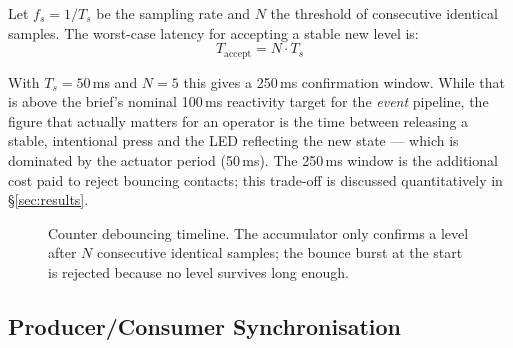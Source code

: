 \documentclass[12pt]{article}
\begin{document}
Let $f_s = 1/T_s$ be the sampling rate and $N$ the threshold of consecutive identical samples. The worst-case latency for accepting a stable new level is:
\begin{equation}
T_{\text{accept}} = N \cdot T_s
\label{eq:debounce_latency}
\end{equation}

With $T_s = 50$\,ms and $N = 5$ this gives a 250\,ms confirmation window. While that is above the brief's nominal 100\,ms reactivity target for the \emph{event} pipeline, the figure that actually matters for an operator is the time between releasing a stable, intentional press and the LED reflecting the new state --- which is dominated by the actuator period (50\,ms). The 250\,ms window is the additional cost paid to reject bouncing contacts; this trade-off is discussed quantitatively in §\ref{sec:results}.

\begin{figure}[H]
\centering
{}
\caption{Counter debouncing timeline. The accumulator only confirms a level after $N$ consecutive identical samples; the bounce burst at the start is rejected because no level survives long enough.}
\label{fig:debounce_timeline}
\end{figure}

\subsection{Producer/Consumer Synchronisation}
\end{document}
